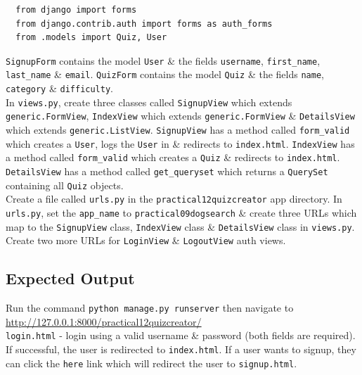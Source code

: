 \documentclass{article}
\begin{document}
\begin{verbatim}
  from django import forms
  from django.contrib.auth import forms as auth_forms
  from .models import Quiz, User
\end{verbatim}

\texttt{SignupForm} contains the model \texttt{User} \& the fields \texttt{username}, \texttt{first\_name}, \texttt{last\_name} \& \texttt{email}. \texttt{QuizForm} contains the model \texttt{Quiz} \& the fields \texttt{name}, \texttt{category} \& \texttt{difficulty}. \\

In \texttt{views.py}, create three classes called \texttt{SignupView} which extends \texttt{generic.FormView}, \texttt{IndexView} which extends \texttt{generic.FormView} \& \texttt{DetailsView} which extends \texttt{generic.ListView}. \texttt{SignupView} has a method called \texttt{form\_valid} which creates a \texttt{User}, logs the \texttt{User} in \& redirects to \texttt{index.html}. \texttt{IndexView} has a method called \texttt{form\_valid} which creates a \texttt{Quiz} \& redirects to \texttt{index.html}. \texttt{DetailsView} has a method called \texttt{get\_queryset} which returns a \texttt{QuerySet} containing all \texttt{Quiz} objects. \\

Create a file called \texttt{urls.py} in the \texttt{practical12quizcreator} app directory. In \texttt{urls.py}, set the \texttt{app\_name} to \texttt{practical09dogsearch} \& create three URLs which map to the \texttt{SignupView} class, \texttt{IndexView} class \& \texttt{DetailsView} class in \texttt{views.py}. Create two more URLs for \texttt{LoginView} \& \texttt{LogoutView} auth views.

\subsection*{Expected Output} 
Run the command \texttt{python manage.py runserver} then navigate to \href{http://127.0.0.1:8000/practical12quizcreator/}{http://127.0.0.1:8000/practical12quizcreator/} \\ 

\texttt{login.html} - login using a valid username \& password (both fields are required). If successful, the user is redirected to \texttt{index.html}. If a user wants to signup, they can click the \texttt{here} link which will redirect the user to \texttt{signup.html}.
\end{document}
